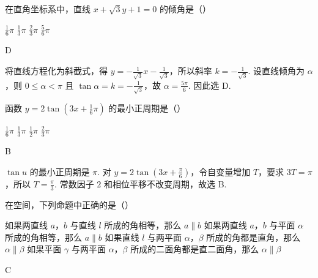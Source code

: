 \begin{problem}

在直角坐标系中，直线 \(x + \sqrt{3} y + 1 = 0\) 的倾角是（\quad）

\choices
    {\(\frac{1}{6}\pi\)}
    {\(\frac{1}{3}\pi\)}
    {\(\frac{2}{3}\pi\)}
    {\(\frac{5}{6}\pi\)}
\end{problem}

\begin{answer}
D
\end{answer}

\begin{solution}
将直线方程化为斜截式，得 \(y=-\frac{1}{\sqrt{3}}x-\frac{1}{\sqrt{3}}\)，所以斜率 \(k=-\frac{1}{\sqrt{3}}\). 设直线倾角为 \(\alpha\)，则 \(0\leqslant\alpha<\pi\) 且 \(\tan\alpha=k=-\frac{1}{\sqrt{3}}\)，故 \(\alpha=\frac{5\pi}{6}\). 因此选 D.
\end{solution}

\begin{problem}

函数 \(y = 2\tan\left( 3x + \frac{1}{6}\pi \right) \) 的最小正周期是（\quad）

\choices
    {\(\frac{1}{6}\pi\)}
    {\(\frac{1}{3}\pi\)}
    {\(\frac{1}{2}\pi\)}
    {\(\frac{2}{3}\pi\)}
\end{problem}

\begin{answer}
B
\end{answer}

\begin{solution}
\(\tan u\) 的最小正周期是 \(\pi\). 对 \(y=2\tan\left(3x+\frac{\pi}{6}\right)\)，令自变量增加 \(T\)，要求 \(3T=\pi\)，所以 \(T=\frac{\pi}{3}\). 常数因子 \(2\) 和相位平移不改变周期，故选 B.
\end{solution}

\begin{problem}

在空间，下列命题中正确的是（\quad）

\choices
    {如果两直线 \(a\)，\(b\) 与直线 \(l\) 所成的角相等，那么 \(a\parallel b\)}
    {如果两直线 \(a\)，\(b\) 与平面 \(\alpha\) 所成的角相等，那么 \(a\parallel b\)}
    {如果直线 \(l\) 与两平面 \(\alpha\)，\(\beta\) 所成的角都是直角，那么 \(\alpha\parallel\beta\)}
    {如果平面 \(\gamma\) 与两平面 \(\alpha\)，\(\beta\) 所成的二面角都是直二面角，那么 \(\alpha\parallel\beta\)}
\end{problem}

\begin{answer}
C
\end{answer}

